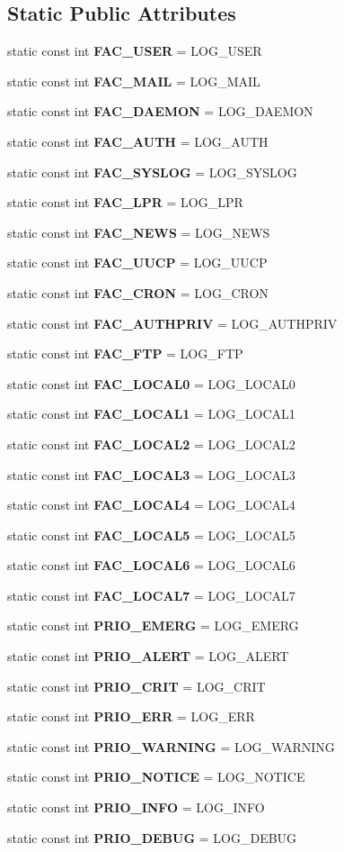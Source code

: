 \subsection*{Static Public Attributes}
\begin{CompactItemize}
\item 
static const int {\bf FAC\_\-USER} = LOG\_\-USER
\item 
static const int {\bf FAC\_\-MAIL} = LOG\_\-MAIL
\item 
static const int {\bf FAC\_\-DAEMON} = LOG\_\-DAEMON
\item 
static const int {\bf FAC\_\-AUTH} = LOG\_\-AUTH
\item 
static const int {\bf FAC\_\-SYSLOG} = LOG\_\-SYSLOG
\item 
static const int {\bf FAC\_\-LPR} = LOG\_\-LPR
\item 
static const int {\bf FAC\_\-NEWS} = LOG\_\-NEWS
\item 
static const int {\bf FAC\_\-UUCP} = LOG\_\-UUCP
\item 
static const int {\bf FAC\_\-CRON} = LOG\_\-CRON
\item 
static const int {\bf FAC\_\-AUTHPRIV} = LOG\_\-AUTHPRIV
\item 
static const int {\bf FAC\_\-FTP} = LOG\_\-FTP
\item 
static const int {\bf FAC\_\-LOCAL0} = LOG\_\-LOCAL0
\item 
static const int {\bf FAC\_\-LOCAL1} = LOG\_\-LOCAL1
\item 
static const int {\bf FAC\_\-LOCAL2} = LOG\_\-LOCAL2
\item 
static const int {\bf FAC\_\-LOCAL3} = LOG\_\-LOCAL3
\item 
static const int {\bf FAC\_\-LOCAL4} = LOG\_\-LOCAL4
\item 
static const int {\bf FAC\_\-LOCAL5} = LOG\_\-LOCAL5
\item 
static const int {\bf FAC\_\-LOCAL6} = LOG\_\-LOCAL6
\item 
static const int {\bf FAC\_\-LOCAL7} = LOG\_\-LOCAL7
\item 
static const int {\bf PRIO\_\-EMERG} = LOG\_\-EMERG
\item 
static const int {\bf PRIO\_\-ALERT} = LOG\_\-ALERT
\item 
static const int {\bf PRIO\_\-CRIT} = LOG\_\-CRIT
\item 
static const int {\bf PRIO\_\-ERR} = LOG\_\-ERR
\item 
static const int {\bf PRIO\_\-WARNING} = LOG\_\-WARNING
\item 
static const int {\bf PRIO\_\-NOTICE} = LOG\_\-NOTICE
\item 
static const int {\bf PRIO\_\-INFO} = LOG\_\-INFO
\item 
static const int {\bf PRIO\_\-DEBUG} = LOG\_\-DEBUG
\end{CompactItemize}
